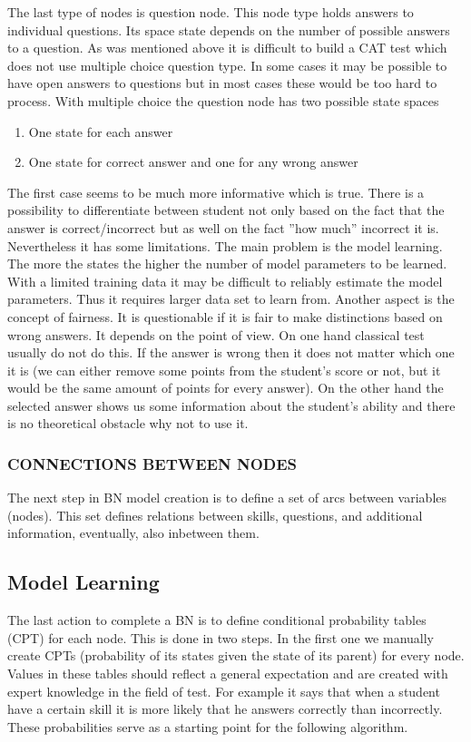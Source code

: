 The last type of nodes is question node. This node type holds answers to individual questions. Its space state depends on the number of possible answers to a question. As was mentioned above it is difficult to build a CAT test which does not use multiple choice question type. In some cases it may be possible to have open answers to questions but in most cases these would be too hard to process. With multiple choice the question node has two possible state spaces
\begin{enumerate}
	\item One state for each answer
	\item One state for correct answer and one for any wrong answer
\end{enumerate}
The first case seems to be much more informative which is true. There is a possibility to differentiate between student not only based on the fact that the answer is correct/incorrect but as well on the fact ''how much'' incorrect it is. Nevertheless it has some limitations. The main problem is the model learning. The more the states the higher the number of model parameters to be learned. With a limited training data it may be difficult to reliably estimate the model parameters. Thus it requires larger data set to learn from. Another aspect is the concept of fairness. It is questionable if it is fair to make distinctions based on wrong answers. It depends on the point of view. On one hand classical test usually do not do this. If the answer is wrong then it does not matter which one it is (we can either remove some points from the student's score or not, but it would be the same amount of points for every answer). On the other hand the selected answer shows us some information about the student's ability and there is no theoretical obstacle why not to use it.

\subsubsection{CONNECTIONS BETWEEN NODES}

The next step in BN model creation is to define a set of arcs between variables (nodes). This set defines relations between skills, questions, and additional information, eventually, also inbetween them.  

\subsection{Model Learning}
The last action to complete a BN is to define conditional probability tables (CPT) for each node. This is done in two steps. In the first one we manually create CPTs (probability of its states given the state of its parent) for every node. Values in these tables should reflect a general expectation and are created with expert knowledge in the field of test. For example it says that when a student have a certain skill it is more likely that he answers correctly than incorrectly. These probabilities serve as a starting point for the following algorithm.

